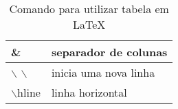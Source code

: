 \documentclass[12pt, a4paper]{article}
\begin{document}
\begin{table}[h]
	\centering
	\begin{tabular}{|l|l|}
	\hline
	\& & separador de colunas \\
	\hline
	$\backslash$ $\backslash$ & inicia uma nova linha \\
	\hline
	$\backslash$hline & linha horizontal \\
	\hline
\end{tabular}
\caption{Comando para utilizar tabela em LaTeX}
\label{tab2}
\end{table}
\end{document}
